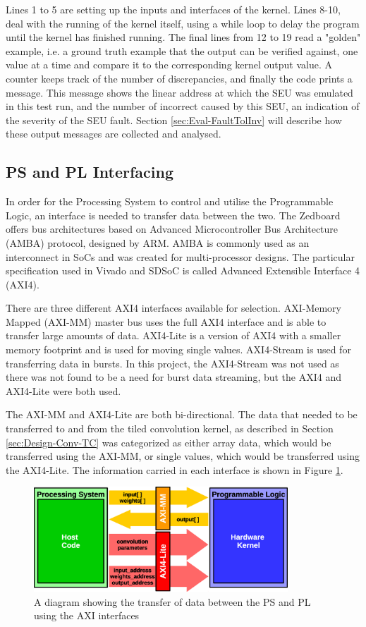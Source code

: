 \documentclass[12pt]{article}
\begin{document}
Lines 1 to 5 are setting up the inputs and interfaces of the kernel. Lines 8-10, deal with the running of the kernel itself, using a while loop to delay the program until the kernel has finished running. The final lines from 12 to 19 read a "golden" example, i.e. a ground truth example that the output can be verified against, one value at a time and compare it to the corresponding kernel output value. A counter keeps track of the number of discrepancies, and finally the code prints a message. This message shows the linear address at which the SEU was emulated in this test run, and the number of incorrect caused by this SEU, an indication of the severity of the SEU fault. Section \ref{sec:Eval-FaultTolInv} will describe how these output messages are collected and analysed.


\subsection{PS and PL Interfacing}
\label{sec:Design-PSnPL}

In order for the Processing System to control and utilise the Programmable Logic, an interface is needed to transfer data between the two. The Zedboard offers bus architectures based on Advanced Microcontroller Bus Architecture (AMBA) protocol, designed by ARM. AMBA is commonly used as an interconnect in SoCs and was created for multi-processor designs. The particular specification used in Vivado and SDSoC is called Advanced Extensible Interface 4 (AXI4). 

There are three different AXI4 interfaces available for selection. AXI-Memory Mapped (AXI-MM) master bus uses the full AXI4 interface and is able to transfer large amounts of data. AXI4-Lite is a version of AXI4 with a smaller memory footprint and is used for moving single values. AXI4-Stream is used for transferring data in bursts. In this project, the AXI4-Stream was not used as there was not found to be a need for burst data streaming, but the AXI4 and AXI4-Lite were both used. 

The AXI-MM and AXI4-Lite are both bi-directional. The data that needed to be transferred to and from the tiled convolution kernel, as described in Section \ref{sec:Design-Conv-TC} was categorized as either array data, which would be transferred using the AXI-MM, or single values, which would be transferred using the AXI4-Lite. The information carried in each interface is shown in Figure \ref{fig:PSnPL}.

\begin{figure} [ht]
\centering
\includegraphics[width=0.85\textwidth]{figures/PSnPL.eps}
\caption{A diagram showing the transfer of data between the PS and PL using the AXI interfaces} 
\label{fig:PSnPL}
\end{figure}
\end{document}

